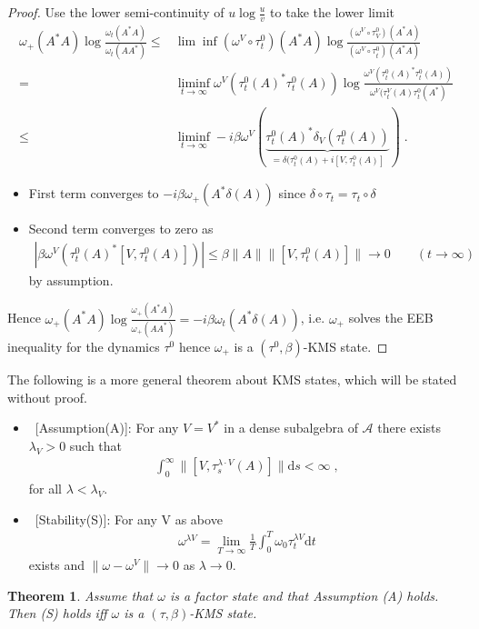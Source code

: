 \documentclass[
a4paper, %
11pt, %
onecolumn, %
openany, %
]{memoir}
\theoremstyle{definition}
\theoremstyle{remark}
\theoremstyle{plain}
\newtheorem{theorem}{Theorem}[chapter]
\begin{document}
\begin{proof}
 Use the lower semi-continuity  of $u\log\frac{u}{v}$ to take the lower limit \begin{align}
 \omega_+(A^*A)\log\frac{\omega_t(A^*A)}{\omega_t(AA^*)}\leq& \lim\inf (\omega^V\circ \tau_t^0)(A^*A)\log\frac{(\omega^V\circ\tau_V^0)(A^*A)}{(\omega^V\circ\tau_t^0)(A^*A)}\\
 =& \liminf\limits_{t\rightarrow\infty} \omega^V(\tau_t^0(A)^*\tau_t^0(A))\log\frac{\omega^V(\tau_t^0(A)^*\tau_t^0(A))}{\omega^V(\tau_t^V(A)\tau_t^0(A^*)}\\
 \leq& \liminf\limits_{t\rightarrow\infty} -i\beta \omega^V(\underbrace{\tau_t^0(A)^*\delta_V(\tau_t^0(A))}_{=\delta(\tau_t^0(A)+i[V,\tau_t^0(A)]})\; .
 \end{align}
\begin{itemize}
\item First term converges to $-i\beta\omega_+(A^*\delta(A))$ since $\delta\circ\tau_t=\tau_t\circ \delta$
\item Second term converges to zero as \begin{align}
|\beta\omega^V(\tau_t^0(A)^*[V,\tau_t^0(A)])|\leq \beta \|A\| \|[V,\tau_t^0(A)]\| \rightarrow 0 \qquad (t\rightarrow \infty)
\end{align}
by assumption.
\end{itemize}
Hence $\omega_+(A^*A)\log\frac{\omega_+(A^*A)}{\omega_+(AA^*)}=-i\beta\omega_t(A^*\delta(A))$, i.e. $\omega_+$ solves the EEB inequality for the dynamics $\tau^0$ hence $\omega_+$ is a $(\tau^0,\beta)$-KMS state.
\end{proof}
The following is a more general theorem about KMS states, which will be stated without proof.
\begin{itemize}
\item ~[Assumption(A)]: For any $V=V^*$ in a dense subalgebra of $\mathcal{A}$ there exists $\lambda_V>0$ such that \begin{align}
\int_0^{\infty}\|[V,\tau_s^{\lambda\cdot V}(A)]\|\mathrm{d}s< \infty\;, 
\end{align}
for all $\lambda<\lambda_V$.
\item ~[Stability(S)]: For any V as above \begin{align}
\omega^{\lambda V}=\lim_{T\rightarrow\infty}\frac{1}{T}\int_0^T\omega_0\tau_t^{\lambda V}\mathrm{d}t
\end{align}
exists and $\|\omega-\omega^V\|\rightarrow 0$ as $\lambda\rightarrow 0$.
\end{itemize}
\begin{theorem}
Assume that $\omega$ is a factor state and that Assumption (A) holds. Then (S) holds iff $\omega$ is a $(\tau,\beta)$-KMS state.
\end{theorem}
\end{document}
